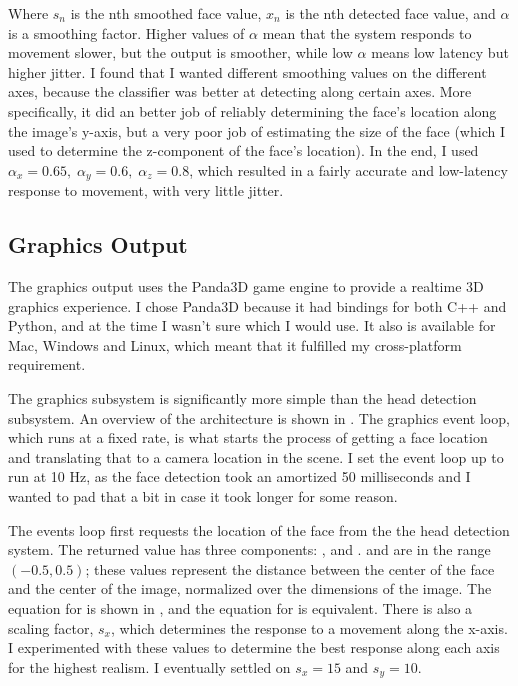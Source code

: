 Where $s_n$ is the nth smoothed face value, $x_n$ is the nth detected
face value, and $\alpha$ is a smoothing factor. Higher values of
$\alpha$ mean that the system responds to movement slower, but the
output is smoother, while low $\alpha$ means low latency but higher
jitter. I found that I wanted different smoothing values on the
different axes, because the classifier was better at detecting along
certain axes. More specifically, it did an better job of reliably
determining the face's location along the image's y-axis, but a very
poor job of estimating the size of the face (which I used to determine
the z-component of the face's location). In the end, I used $\alpha_x
= 0.65, \; \alpha_y = 0.6, \; \alpha_z = 0.8$, which resulted in a
fairly accurate and low-latency response to movement, with very little
jitter.

\subsection{Graphics Output}

The graphics output uses the Panda3D game engine to provide a realtime
3D graphics experience. I chose Panda3D because it had bindings for
both C++ and Python, and at the time I wasn't sure which I would
use. It also is available for Mac, Windows and Linux, which meant that
it fulfilled my cross-platform requirement.

The graphics subsystem is significantly more simple than the head
detection subsystem. An overview of the architecture is shown in
. The graphics event loop, which runs at a fixed
rate, is what starts the process of getting a face location and
translating that to a camera location in the scene. I set the event
loop up to run at 10 Hz, as the face detection took an amortized 50
milliseconds and I wanted to pad that a bit in case it took longer for
some reason. 

The events loop first requests the location of the face from the the
head detection system. The returned value has three components:
,  and .  and  are in the
range $(-0.5, 0.5)$; these values represent the distance between the
center of the face and the center of the image, normalized over the
dimensions of the image. The equation for  is shown in
, and the equation for  is equivalent. There is
also a scaling factor, $s_x$, which determines the response to a
movement along the x-axis. I experimented with these values to
determine the best response along each axis for the highest realism. I
eventually settled on $s_x = 15$ and $s_y = 10$.


